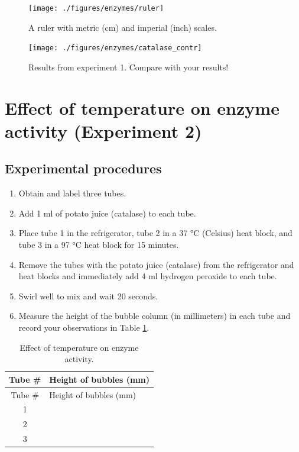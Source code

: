 \documentclass[]{book}
\providecommand{\tightlist}{%
  \setlength{\itemsep}{0pt}\setlength{\parskip}{0pt}}
\theoremstyle{definition}
\theoremstyle{definition}
\theoremstyle{definition}
\theoremstyle{remark}
\begin{document}
\begin{figure}

{\centering \texttt{[image: ./figures/enzymes/ruler]} 

}

\caption{A ruler with metric (cm) and imperial (inch) scales.}\label{fig:ruler}
\end{figure}

\begin{figure}

{\centering \texttt{[image: ./figures/enzymes/catalase\_contr]} 

}

\caption{Results from experiment 1. Compare with your results!}\label{fig:contr}
\end{figure}

\section{Effect of temperature on enzyme activity (Experiment
2)}\label{effect-of-temperature-on-enzyme-activity-experiment-2}

\subsection{Experimental procedures}\label{experimental-procedures-21}

\begin{enumerate}
\def\labelenumi{\arabic{enumi}.}
\tightlist
\item
  Obtain and label three tubes.
\item
  Add 1 ml of potato juice (catalase) to each tube.
\item
  Place tube 1 in the refrigerator, tube 2 in a 37 °C (Celsius) heat
  block, and tube 3 in a 97 °C heat block for 15 minutes.
\item
  Remove the tubes with the potato juice (catalase) from the
  refrigerator and heat blocks and immediately add 4 ml hydrogen
  peroxide to each tube.
\item
  Swirl well to mix and wait 20 seconds.
\item
  Measure the height of the bubble column (in millimeters) in each tube
  and record your observations in Table \ref{tab:temp}.
\end{enumerate}

\begin{longtable}[]{@{}cl@{}}
\caption{\label{tab:temp} Effect of temperature on enzyme
activity.}\tabularnewline
\toprule
Tube \# & Height of bubbles (mm)\tabularnewline
\midrule
\endfirsthead
\toprule
Tube \# & Height of bubbles (mm)\tabularnewline
\midrule
\endhead
1 &\tabularnewline
2 &\tabularnewline
3 &\tabularnewline
\bottomrule
\end{longtable}
\end{document}
